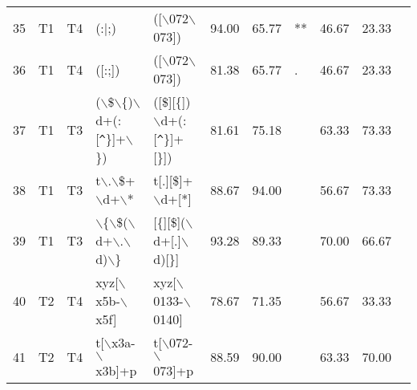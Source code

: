 \begin{table}[ht]
\begin{tabular}{rllllrrlrrl}
  35 & T1 & T4 & (:$|$;) & ([$\backslash$072$\backslash$073]) & 94.00 & 65.77 & ** & 46.67 & 23.33 &   \\ 
  36 & T1 & T4 & ([:;]) & ([$\backslash$072$\backslash$073]) & 81.38 & 65.77 & . & 46.67 & 23.33 &   \\ 
  37 & T1 & T3 & ($\backslash$\$$\backslash$\{)$\backslash$d+(:[\verb|^|\}]+$\backslash$\}) & ([\$][\{])$\backslash$d+(:[\verb|^|\}]+[\}]) & 81.61 & 75.18 &   & 63.33 & 73.33 &   \\ 
  38 & T1 & T3 & t$\backslash$.$\backslash$\$+$\backslash$d+$\backslash$* & t[.][\$]+$\backslash$d+[*] & 88.67 & 94.00 &   & 56.67 & 73.33 &   \\ 
  39 & T1 & T3 & $\backslash$\{$\backslash$\$($\backslash$d+$\backslash$.$\backslash$d)$\backslash$\} & [\{][\$]($\backslash$d+[.]$\backslash$d)[\}] & 93.28 & 89.33 &   & 70.00 & 66.67 &   \\ 
  40 & T2 & T4 & xyz[$\backslash$x5b-$\backslash$x5f] & xyz[$\backslash$0133-$\backslash$0140] & 78.67 & 71.35 &   & 56.67 & 33.33 &   \\ 
  41 & T2 & T4 & t[$\backslash$x3a-$\backslash$x3b]+p & t[$\backslash$072-$\backslash$073]+p & 88.59 & 90.00 &   & 63.33 & 70.00 &   \\ 
   \hline
\end{tabular}
\end{table}
